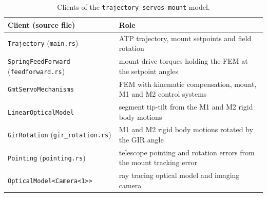 \documentclass{gmto}
\numberwithin{table}{section}
\numberwithin{equation}{section}
\newcommand{\code}[1]{\texttt{#1}}
\begin{document}
\begin{table}[htbp]
  \centering
  \caption{Clients of the \code{trajectory-servos-mount} model.}
  \label{tab:clients}
  \begin{tabularx}{\linewidth}{lX}
    \toprule
    Client (source file)                                      & Role \\
    \midrule
    \code{Trajectory} (\code{main.rs})                        & ATP trajectory, mount setpoints and field rotation \\
    \code{SpringFeedForward} (\code{feedforward.rs})          & mount drive torques holding the FEM at the setpoint angles \\
    \code{GmtServoMechanisms}                                 & FEM with kinematic compensation, mount, M1 and M2 control systems \\
    \code{LinearOpticalModel}                                 & segment tip-tilt from the M1 and M2 rigid body motions \\
    \code{GirRotation} (\code{gir\_rotation.rs})              & M1 and M2 rigid body motions rotated by the GIR angle \\
    \code{Pointing} (\code{pointing.rs})                      & telescope pointing and rotation errors from the mount tracking error \\
    \code{OpticalModel<Camera<1>>} & ray tracing optical model and imaging camera \\
    \bottomrule
  \end{tabularx}
\end{table}
\end{document}
